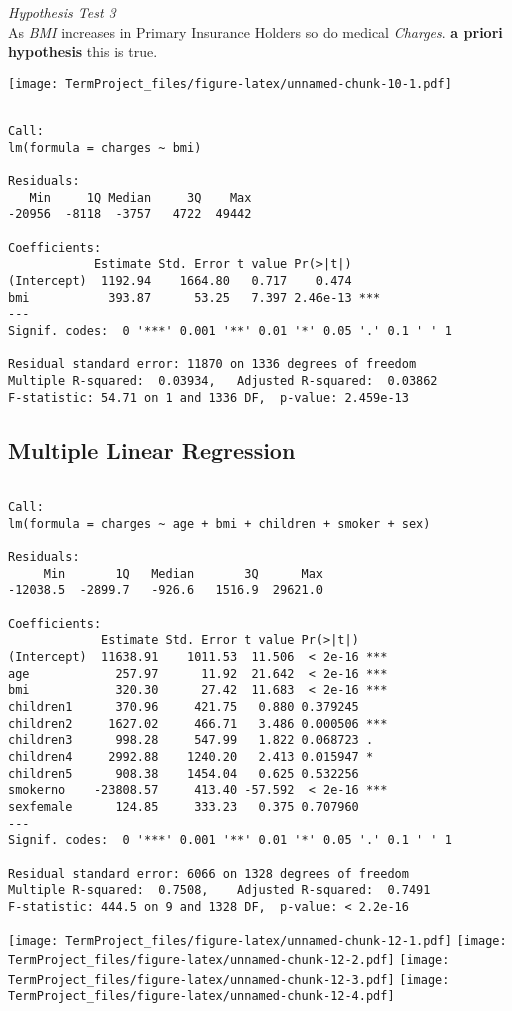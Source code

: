 \documentclass[]{article}
\begin{document}
\emph{Hypothesis Test 3}\\
As \emph{BMI} increases in Primary Insurance Holders so do medical
\emph{Charges}. \textbf{a priori hypothesis} this is true.

\texttt{[image: TermProject\_files/figure-latex/unnamed-chunk-10-1.pdf]}

\begin{verbatim}

Call:
lm(formula = charges ~ bmi)

Residuals:
   Min     1Q Median     3Q    Max 
-20956  -8118  -3757   4722  49442 

Coefficients:
            Estimate Std. Error t value Pr(>|t|)    
(Intercept)  1192.94    1664.80   0.717    0.474    
bmi           393.87      53.25   7.397 2.46e-13 ***
---
Signif. codes:  0 '***' 0.001 '**' 0.01 '*' 0.05 '.' 0.1 ' ' 1

Residual standard error: 11870 on 1336 degrees of freedom
Multiple R-squared:  0.03934,   Adjusted R-squared:  0.03862 
F-statistic: 54.71 on 1 and 1336 DF,  p-value: 2.459e-13
\end{verbatim}

\hypertarget{multiple-linear-regression}{%
\subsection{Multiple Linear
Regression}\label{multiple-linear-regression}}

\begin{verbatim}

Call:
lm(formula = charges ~ age + bmi + children + smoker + sex)

Residuals:
     Min       1Q   Median       3Q      Max 
-12038.5  -2899.7   -926.6   1516.9  29621.0 

Coefficients:
             Estimate Std. Error t value Pr(>|t|)    
(Intercept)  11638.91    1011.53  11.506  < 2e-16 ***
age            257.97      11.92  21.642  < 2e-16 ***
bmi            320.30      27.42  11.683  < 2e-16 ***
children1      370.96     421.75   0.880 0.379245    
children2     1627.02     466.71   3.486 0.000506 ***
children3      998.28     547.99   1.822 0.068723 .  
children4     2992.88    1240.20   2.413 0.015947 *  
children5      908.38    1454.04   0.625 0.532256    
smokerno    -23808.57     413.40 -57.592  < 2e-16 ***
sexfemale      124.85     333.23   0.375 0.707960    
---
Signif. codes:  0 '***' 0.001 '**' 0.01 '*' 0.05 '.' 0.1 ' ' 1

Residual standard error: 6066 on 1328 degrees of freedom
Multiple R-squared:  0.7508,    Adjusted R-squared:  0.7491 
F-statistic: 444.5 on 9 and 1328 DF,  p-value: < 2.2e-16
\end{verbatim}

\texttt{[image: TermProject\_files/figure-latex/unnamed-chunk-12-1.pdf]}
\texttt{[image: TermProject\_files/figure-latex/unnamed-chunk-12-2.pdf]}
\texttt{[image: TermProject\_files/figure-latex/unnamed-chunk-12-3.pdf]}
\texttt{[image: TermProject\_files/figure-latex/unnamed-chunk-12-4.pdf]}
\end{document}
